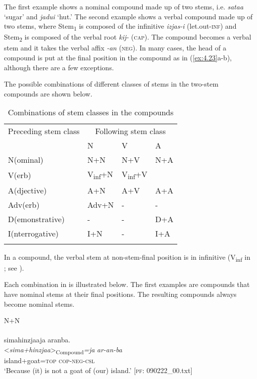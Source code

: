 The first example shows a nominal compound made up of two stems, i.e. \textit{sataa} ‘sugar’ and \textit{jadui} ‘hut.’ The second example shows a verbal compound made up of two stems, where Stem\textsubscript{1} is composed of the infinitive \textit{izjas-i} (let.out-\textsc{inf}) and Stem\textsubscript{2} is composed of the verbal root \textit{kij-} (\textsc{cap}). The compound becomes a verbal stem and it takes the verbal affix \textit{-an} (\textsc{neg}). In many cases, the head of a compound is put at the final position in the compound as in (\ref{ex:4.23}a-b), although there are a few exceptions.

  The possible combinations of different classes of stems in the two-stem compounds are shown below.

\begin{table}
\caption{\label{tab:25}Combinations of stem classes in the compounds}
\begin{tabularx}{\textwidth}{XXXl}
\lsptoprule
Preceding stem class  & \multicolumn{3}{c}{Following stem class}\\\cmidrule(lr){2-4}
& N & V & A\\\midrule
N(ominal)       & N+N  & N+V & N+A\\
V(erb)          & V\textsubscript{inf}+N &  V\textsubscript{inf}+V & {}\\
A(djective)     & A+N & A+V & A+A\\
Adv(erb)        & Adv+N & {}-  & {}-\\
D(emonstrative) & {}- & {}- & D+A\\
I(nterrogative) & I+N & {}- & I+A\\
\lspbottomrule
\end{tabularx}
\end{table}

In a compound, the verbal stem at non-stem-final position is in infinitive (V\textsubscript{inf} in ; see ).

Each combination in  is illustrated below. The first examples are compounds that have nominal stems at their final positions. The resulting compounds always become nominal stems.

\ea \label{ex:4.24}
\ea N+N \label{ex:4.24a}\\\\
\glll  simahinzjaaja  aranba.\\
      <\textit{sima+hinzjaa}>\textsubscript{Compound}\textit{=ja}  \textit{ar-an-ba}\\
      island+goat=\textsc{top}  \textsc{cop}-\textsc{neg}-\textsc{csl}\\
      \glt       ‘Because (it) is not a goat of (our) island.’ [\textsc{pf}: 090222\_00.txt]

